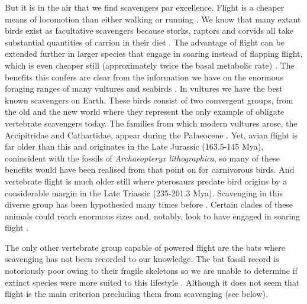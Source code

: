 \documentclass[a4paper,12pt]{article}
\begin{document}
But it is in the air that we find scavengers par excellence. 
Flight is a cheaper means of locomotion than either walking or running \citep{tucker1975energetic}. 
We know that many extant birds exist as facultative scavengers because storks, raptors and corvids all take substantial quantities of carrion in their diet \citep{kendall2013alternative}.
The advantage of flight can be extended further in larger species that engage in soaring instead of flapping flight, which is even cheaper still (approximately twice the basal metabolic rate) \citep{hedenstrom1993migration,spivey2014analysing}.
The benefits this confers are clear from the information we have on the enormous foraging ranges of many vultures \citep{spiegel2013factors} and seabirds \citep{thaxter2012seabird}.
In vultures we have the best known scavengers on Earth. 
These birds consist of two convergent groups, from the old and the new world where they represent the only example of obligate vertebrate scavengers today.
The families from which modern vultures arose, the Accipitridae and Cathartidae, appear during the Palaeocene \citep[66 - 56 Mya; ][]{Jetz2012, Jarvis2014}.
Yet, avian flight is far older than this and originates in the Late Jurassic (163.5-145 Mya), conincident with the fossils of \textit{Archaeopteryx lithographica}, so many of these benefits would have been realised from that point on for carnivorous birds.
And vertebrate flight is much older still where pterosaurs predate bird origins by a considerable margin in the Late Triassic (235-201.3 Mya).
Scavenging in this diverse group has been hypothesied many times before \citep{witton2008reappraisal}.
Certain clades of these animals could reach enormous sizes \citep[e.g. Azhdarchids with wingspans of 11 metres; ][]{witton2010size} and, notably, look to have engaged in soaring flight \citep{witton2010size}.

The only other vertebrate group capable of powered flight are the bats where scavenging has not been recorded to our knowledge.
The bat fossil record is notoriously poor owing to their fragile skeletons so we are unable to determine if extinct species were more suited to this lifestyle \citep{eiting2009global}. %
Although it does not seem that flight is the main criterion precluding them from scavenging (see below).
\end{document}
